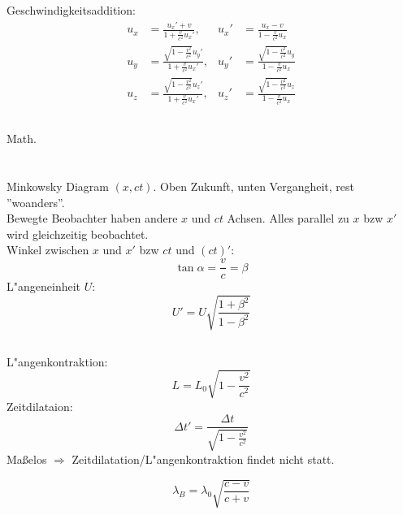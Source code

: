 \documentclass[12pt]{report}
\begin{document}
Geschwindigkeitsaddition:
\begin{align*}
u_x&=\frac{u_x'+v}{1+\frac{v}{c^2}u_x'},&u_x'&=\frac{u_x-v}{1-\frac{v}{c^2}u_x}\\
u_y&=\frac{\sqrt{1-\frac{v^2}{c^2}}u_y'}{1+\frac{v}{c^2}u_x'},&u_y'&=\frac{\sqrt{1-\frac{v^2}{c^2}}u_y}{1-\frac{v}{c^2}u_x}\\
u_z&=\frac{\sqrt{1-\frac{v^2}{c^2}}u_z'}{1+\frac{v}{c^2}u_x'},&u_z'&=\frac{\sqrt{1-\frac{v^2}{c^2}}u_z}{1-\frac{v}{c^2}u_x}
\end{align*}

\subsection{}

Math.

\section{}

\subsection{}

\subsection{}

Minkowsky Diagram $(x,ct)$. Oben Zukunft, unten Vergangheit, rest ''woanders''.\\
Bewegte Beobachter haben andere $x$ und $ct$ Achsen. Alles parallel zu $x$ bzw $x'$ wird gleichzeitig beobachtet.\\
Winkel zwischen $x$ und $x'$ bzw $ct$ und $(ct)'$: \[\tan\alpha=\frac{v}{c}=\beta\]
L"angeneinheit $U$: \[U'=U\sqrt{\frac{1+\beta^2}{1-\beta^2}}\]

\subsection{}

L"angenkontraktion:
\[L=L_0\sqrt{1-\frac{v^2}{c^2}}\]
Zeitdilataion:
\[\Delta t'=\frac{\Delta t}{\sqrt{1-\frac{v^2}{c^2}}}\]
Ma\ss elos $\Rightarrow$ Zeitdilatation/L"angenkontraktion findet nicht statt.

\[\lambda_B=\lambda_0\sqrt{\frac{c-v}{c+v}}\]

\section{}
\end{document}
